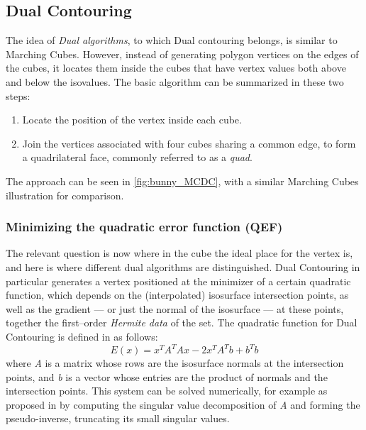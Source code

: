 \subsection{Dual Contouring}
The idea of \emph{Dual algorithms}, to which Dual contouring belongs, is similar to Marching Cubes. However, instead of generating polygon vertices on the
edges of the cubes, it locates them inside the cubes that have vertex values both above and below the isovalues. The basic algorithm can be summarized in these two steps:
\begin{enumerate}
\item Locate the position of the vertex inside each cube.
\item Join the vertices associated with four cubes sharing a common edge, to form a quadrilateral face, commonly referred to as a \emph{quad}.
\end{enumerate}
The approach can be seen in \autoref{fig:bunny_MCDC}, with a similar Marching Cubes illustration for comparison. 

\subsubsection{Minimizing the quadratic error function (QEF)}
The relevant question is now where in the cube the ideal place for the vertex is, and here is where different dual algorithms are distinguished. Dual Contouring in particular generates a vertex positioned at the minimizer of a certain quadratic function, which depends on the (interpolated) isosurface intersection points, as well as the gradient --- or just the normal of the isosurface --- at these points, together the first--order \emph{Hermite data} of the set.
The quadratic function for Dual Contouring is defined in \cite{Hermite2002} as follows:
\begin{equation*}
E(x)= x^TA^TAx-2x^TA^Tb+b^Tb
\end{equation*}
where \textit{A} is a matrix whose rows are the isosurface normals at the intersection points, and \textit{b} is a vector whose entries are the product of normals and the intersection points. This system can be solved numerically, for example as proposed in \cite{Hermite2002} by computing the singular value decomposition of \textit{A} and forming the pseudo-inverse, truncating its small singular values. 


